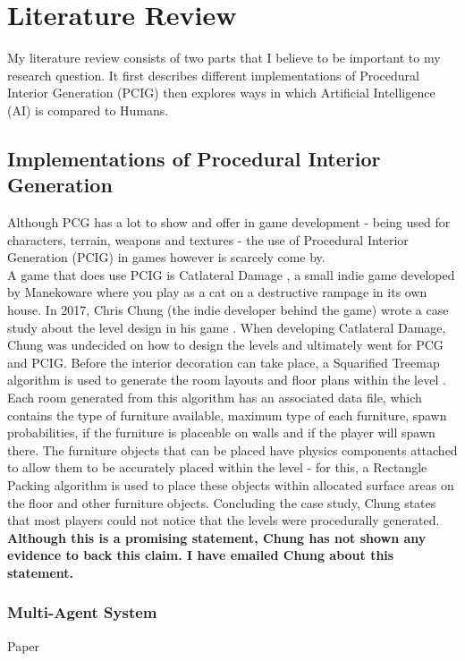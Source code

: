 \section{Literature Review}
My literature review consists of two parts that I believe to be important to my research question.
It first describes different implementations of Procedural Interior Generation (PCIG) then explores
ways in which Artificial Intelligence (AI) is compared to Humans.

\subsection{Implementations of Procedural Interior Generation}
Although PCG has a lot to show and offer in game development - being used for
characters, terrain, weapons and textures - the use of Procedural Interior Generation 
(PCIG) in games however is scarcely come by.
\\
A game that does use PCIG is Catlateral Damage \cite{game:catlateral},
a small indie game developed by Manekoware where you play as a cat on a destructive rampage 
in its own house.
In 2017, Chris Chung (the indie developer behind the game) wrote a case study about the level design in his game \cite{what-is-pcg}.
When developing Catlateral Damage, Chung was 
undecided on how to design the levels and ultimately went for PCG and PCIG\cite{pcg_in_gd}.
Before the interior decoration can take place, a Squarified Treemap algorithm 
is used to generate the room layouts and floor plans within the level \cite{squarified-treemap}.
Each room generated from this algorithm has an associated data file, which contains the type of furniture available, maximum type of each furniture, spawn probabilities, if the furniture is placeable on walls and if the player will spawn there.
The furniture objects that can be placed have physics components attached to allow them to be accurately placed within the level -
for this, a Rectangle Packing algorithm is used to place these objects within allocated surface areas on the floor and other furniture objects.
Concluding the case study, Chung states that most players could not notice that the levels were procedurally generated.
\textbf{Although this is a promising statement, Chung has not shown any evidence to back this claim. I have emailed Chung about this statement.}


\subsubsection*{Multi-Agent System}
Paper \cite{real-time-walkthroughs}
